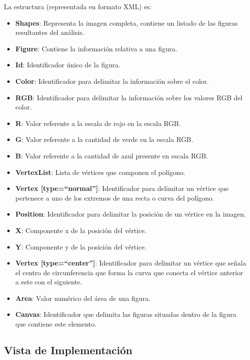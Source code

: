 	La estructura (representada en formato XML) es:\\
	\begin{itemize}
	\item \textbf{Shapes}: Representa la imagen completa, contiene un listado de las figuras resultantes del análisis.
	\item \textbf{Figure}: Contiene la información relativa a una figura.
	\item \textbf{Id}: Identificador único de la figura.
	\item \textbf{Color}: Identificador para delimitar la información sobre el color.
	\item \textbf {RGB}: Identificador para delimitar la información sobre los valores RGB del color.
	\item \textbf{R}: Valor referente a la escala de rojo en la escala RGB.
	\item \textbf{G}: Valor referente a la cantidad de verde en la escala RGB.
	\item \textbf{B}: Valor referente a la cantidad de azul presente en escala RGB.
	\item \textbf{VertexList}: Lista de vértices que componen el polígono.
	\item \textbf{Vertex [type=``normal'']}: Identificador para delimitar un vértice que pertenece a uno de los extremos de una recta o curva del polígono.
	\item \textbf{Position}: Identificador para delimitar la posición de un vértice en la imagen.
	\item \textbf{X}: Componente x de la posición del vértice.
	\item \textbf{Y}: Componente y de la posición del vértice.
	\item \textbf{Vertex [type=``center'']}: Identificador para delimitar un vértice que señala el centro de circunferencia que forma la curva que conecta el vértice anterior a este con el siguiente.
	\item \textbf{Area}: Valor numérico del área de una figura.
	\item \textbf{Canvas}: Identificador que delimita las figuras situadas dentro de la figura que contiene este elemento. 
	\end{itemize}
	


\subsection{Vista de Implementación}

